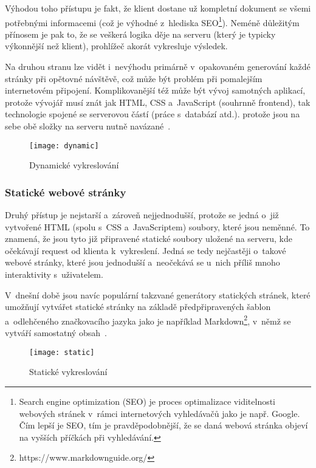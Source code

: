 Výhodou toho přístupu je fakt, že klient dostane už kompletní dokument se všemi potřebnými informacemi (což je výhodné z~hlediska SEO\footnote{Search engine optimization (SEO) je proces optimalizace viditelnosti webových stránek v~rámci internetových vyhledávačů jako je např. Google. Čím lepší je SEO, tím je pravděpodobnější, že se daná webová stránka objeví na vyšších příčkách při vyhledávání.}). Neméně důležitým přínosem je pak to, že se veškerá logika děje na serveru (který je typicky výkonnější než klient), prohlížeč akorát vykresluje výsledek.

Na druhou stranu lze vidět i~nevýhodu primárně v~opakovaném generování každé stránky při opětovné návštěvě, což může být problém při pomalejším internetovém připojení. Komplikovanější též může být vývoj samotných aplikací, protože vývojář musí znát jak HTML, CSS a~JavaScript (souhrnně frontend), tak technologie spojené se serverovou částí (práce s~databází atd.). protože jsou na sebe obě složky na serveru nutně navázané~\parencite{spa}.

\begin{figure}[ht]   
    \centering
    \texttt{[image: dynamic]}  
    \caption{Dynamické vykreslování}
    \label{dynamic}
 \end{figure}

\hypertarget{statickuxe9-webovuxe9-struxe1nky}{%
\subsubsection{Statické webové stránky}\label{statickuxe9-webovuxe9-struxe1nky}}

Druhý přístup je nejstarší a~zároveň nejjednodušší, protože se jedná o~již vytvořené HTML (spolu s~CSS a~JavaScriptem) soubory, které jsou neměnné. To znamená, že jsou tyto již připravené statické soubory uložené na serveru, kde očekávají request od klienta k~vykreslení. Jedná se tedy nejčastěji o~takové webové stránky, které jsou jednodušší a~neočekává se u~nich příliš mnoho interaktivity s~uživatelem.

V~dnešní době jsou navíc populární takzvané generátory statických stránek, které umožňují vytvářet statické stránky na základě předpřipravených šablon a~odlehčeného značkovacího jazyka jako je například Markdown\footnote{https://www.markdownguide.org/}, v~němž se vytváří samostatný obsah~\parencite{spa}.

\begin{figure}[ht]   
    \centering
    \texttt{[image: static]}  
    \caption{Statické vykreslování}
    \label{static}
 \end{figure}

